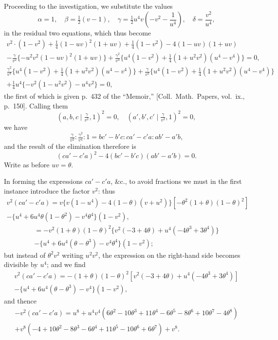 \documentclass[11pt,a4paper]{book}
\begin{document}
\newpage
Proceeding to the investigation, we substitute the values
\[
\alpha = 1,\quad \beta = \tfrac{1}{2}(v - 1),\quad \gamma = \tfrac{1}{2}u^4 v\left(-v^2 - \frac{1}{u^4}\right),\quad \delta = \frac{v^2}{u^4},
\]
in the residual two equations, which thus become
\begin{gather*}
v^2 \cdot (1 - v^2) + \tfrac{1}{4}(1 - uv)^2(1 + uv) + \tfrac{1}{4}(1 - v^2) - 4(1 - uv)(1 + uv) \\
- \frac{\gamma}{v^2}\{-u^2 v^2 (1 - uv)^2 (1 + uv)\} + \frac{\gamma^2}{v^4}\{u^4(1 - v^2) + \tfrac{1}{4}(1 + u^2 v^2)(u^4 - v^4)\} = 0,
\end{gather*}
\begin{gather*}
\frac{\gamma^2}{v^4}\{u^4(1 - v^2) + \tfrac{1}{4}(1 + u^2 v^2)(u^4 - v^4)\} + \frac{\gamma}{v^2}\{u^4(1 - v^2) + \tfrac{1}{4}(1 + u^2 v^2)(u^4 - v^4)\} \\
+ \frac{1}{4}u^4\{-v^2(1 - u^2 v^2) - u^4 v^2\} = 0,
\end{gather*}
the first of which is given p.~432 of the ``Memoir,'' [Coll.\ Math.\ Papers, vol.\ ix., p.~150]. Calling them
\[
(a, b, c \mid \tfrac{\gamma}{v^2}, 1)^2 = 0,\quad (a', b', c' \mid \tfrac{\gamma}{v^2}, 1)^2 = 0,
\]
we have
\[
\tfrac{\gamma}{v^2} : \tfrac{\gamma^2}{v^4} : 1 = bc' - b'c : ca' - c'a : ab' - a'b,
\]
and the result of the elimination therefore is
\[
(ca' - c'a)^2 - 4(bc' - b'c)(ab' - a'b) = 0.
\]
Write as before $uv = \theta$.

In forming the expressions $ca' - c'a$, \&c., to avoid fractions we must in the first instance introduce the factor $v^2$: thus
\begin{multline*}
v^2(ca' - c'a) = v\{v(1 - u^4) - 4(1 - \theta)(v + u^2)\}[-\theta^2(1 + \theta)(1 - \theta)^2]\\
- \{u^4 + 6u^4\theta(1 - \theta^2) - v^4\theta^4\}(1 - v^2),
\end{multline*}
\begin{multline*}
= -v^2(1 + \theta)(1 - \theta)^2\{v^2(-3 + 4\theta) + u^4(-4\theta^3 + 3\theta^4)\}\\
- \{u^4 + 6u^4(\theta - \theta^3) - v^4\theta^4\}(1 - v^2);
\end{multline*}
but instead of $\theta^2 v^2$ writing $u^2 v^2$, the expression on the right-hand side becomes divisible by $u^4$; and we find
\begin{multline*}
v^2(ca' - c'a) = -(1 + \theta)(1 - \theta)^2[v^2(-3 + 4\theta) + u^4(-4\theta^3 + 3\theta^4)]\\
- \{u^4 + 6u^4(\theta - \theta^3) - v^4\}(1 - v^2),
\end{multline*}
and thence
\begin{multline*}
-v^2(ca' - c'a) = u^8 + u^4 v^4(6\theta^2 - 10\theta^3 + 11\theta^4 - 6\theta^5 - 8\theta^6 + 10\theta^7 - 4\theta^8)\\
+ v^8(-4 + 10\theta^2 - 8\theta^3 - 6\theta^4 + 11\theta^5 - 10\theta^6 + 6\theta^7) + v^8.
\end{multline*}
\end{document}

